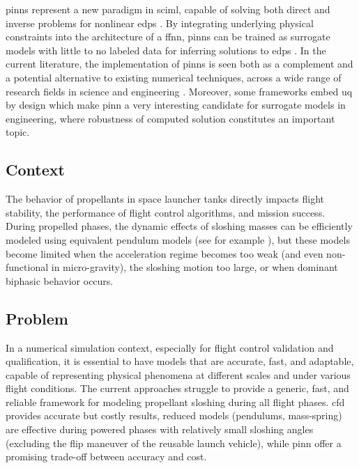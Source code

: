 \documentclass[12pt]{article}
\begin{document}
	\gls{pinns} represent a new paradigm in \gls{sciml}, capable of solving both direct and inverse problems for nonlinear \gls{edps} \cite{raissiPhysicsinformedNeuralNetworks2019}. By integrating underlying physical constraints into the architecture of a \gls{ffnn}, \gls{pinns} can be trained as surrogate models with little to no labeled data for inferring solutions to \gls{edps} \cite{cuomoScientificMachineLearning2022}.
	In the current literature, the implementation of \gls{pinns} is seen both as a complement and a potential alternative to existing numerical techniques, across a wide range of research fields in science and engineering \cite{maoPhysicsinformedNeuralNetworks2020, buosoPersonalisingLeftventricularBiophysical2021, caiPhysicsInformedNeuralNetworks2021}.
	Moreover, some frameworks embed \gls{uq} by design \cite{yangBPINNsBayesianPhysicsInformed2021,zhangQuantifyingTotalUncertainty2018} which make \acrshort{pinn} a very interesting candidate for surrogate models in engineering, where robustness of computed solution constitutes an important topic.
	
	\subsection*{Context}
	
	The behavior of propellants in space launcher tanks directly impacts flight stability, the performance of flight control algorithms, and mission success. During propelled phases, the dynamic effects of sloshing masses can be efficiently modeled using equivalent pendulum models (see for example \cite{ibrahimLiquidSloshingDynamics2005a}), but these models become limited when the acceleration regime becomes too weak (and even non-functional in micro-gravity), the sloshing motion too large, or when dominant biphasic behavior occurs.
	
	\subsection*{Problem}
	
	In a numerical simulation context, especially for flight control validation and qualification, it is essential to have models that are accurate, fast, and adaptable, capable of representing physical phenomena at different scales and under various flight conditions.
	The current approaches struggle to provide a generic, fast, and reliable framework for modeling propellant sloshing during all flight phases. \acrshort{cfd} provides accurate but costly results, reduced models (pendulums, mass-spring) are effective during powered phases with relatively small sloshing angles (excluding the flip maneuver of the reusable launch vehicle), while \acrshort{pinn} offer a promising trade-off between accuracy and cost.
	
\end{document}
